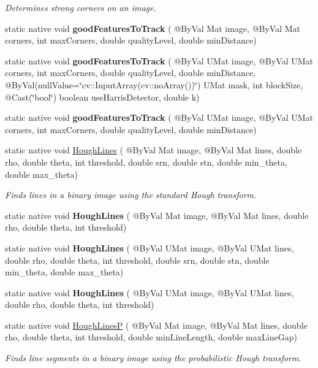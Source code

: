 \begin{DoxyCompactItemize}
\begin{DoxyCompactList}\small\item\em Determines strong corners on an image. \end{DoxyCompactList}\item 
static native void {\bfseries good\+Features\+To\+Track} ( @By\+Val Mat image, @By\+Val Mat corners, int max\+Corners, double quality\+Level, double min\+Distance)
\item 
static native void {\bfseries good\+Features\+To\+Track} ( @By\+Val U\+Mat image, @By\+Val U\+Mat corners, int max\+Corners, double quality\+Level, double min\+Distance, @By\+Val(null\+Value=\char`\"{}cv\+::\+Input\+Array(cv\+::no\+Array())\char`\"{}) U\+Mat mask, int block\+Size, @Cast(\char`\"{}bool\char`\"{}) boolean use\+Harris\+Detector, double k)
\item 
static native void {\bfseries good\+Features\+To\+Track} ( @By\+Val U\+Mat image, @By\+Val U\+Mat corners, int max\+Corners, double quality\+Level, double min\+Distance)
\item 
static native void \hyperlink{group__imgproc__feature_ga304555e089d6883caf9ac96ebef50718}{Hough\+Lines} ( @By\+Val Mat image, @By\+Val Mat lines, double rho, double theta, int threshold, double srn, double stn, double min\+\_\+theta, double max\+\_\+theta)
\begin{DoxyCompactList}\small\item\em Finds lines in a binary image using the standard Hough transform. \end{DoxyCompactList}\item 
static native void {\bfseries Hough\+Lines} ( @By\+Val Mat image, @By\+Val Mat lines, double rho, double theta, int threshold)
\item 
static native void {\bfseries Hough\+Lines} ( @By\+Val U\+Mat image, @By\+Val U\+Mat lines, double rho, double theta, int threshold, double srn, double stn, double min\+\_\+theta, double max\+\_\+theta)
\item 
static native void {\bfseries Hough\+Lines} ( @By\+Val U\+Mat image, @By\+Val U\+Mat lines, double rho, double theta, int threshold)
\item 
static native void \hyperlink{group__imgproc__feature_gaac39ae22179f4396e7034f6d2a4cce1e}{Hough\+LinesP} ( @By\+Val Mat image, @By\+Val Mat lines, double rho, double theta, int threshold, double min\+Line\+Length, double max\+Line\+Gap)
\begin{DoxyCompactList}\small\item\em Finds line segments in a binary image using the probabilistic Hough transform. \end{DoxyCompactList}\item 

\end{DoxyCompactItemize}
